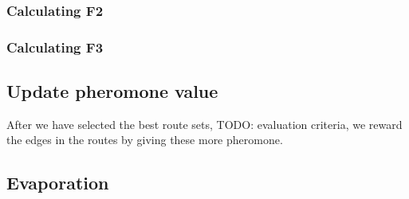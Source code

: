 \subsubsection{Calculating F2}
\subsubsection{Calculating F3}

\subsection{Update pheromone value}

\begin{algorithm}[H]
\end{algorithm}

After we have selected the best route sets, TODO: evaluation criteria, we reward the edges in the routes by giving these more pheromone.


\subsection{Evaporation}

\begin{algorithm}[H]
\end{algorithm}


